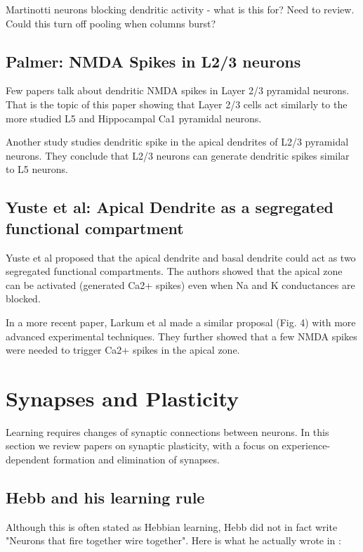 \documentclass{article} %
\begin{document}
Martinotti neurons blocking dendritic activity - what is this for? Need to
review. Could this turn off pooling when columns burst?


\subsection{Palmer: NMDA Spikes in L2/3 neurons}

Few papers talk about dendritic NMDA spikes in Layer 2/3 pyramidal neurons.
That is the topic of this paper \cite{Palmer2014} showing that Layer 2/3 cells
act similarly to the more studied L5 and Hippocampal Ca1 pyramidal neurons.

Another study \cite{Larkum2007} studies dendritic spike in the apical dendrites of L2/3 pyramidal neurons. They conclude that L2/3 neurons can generate dendritic spikes similar to L5 neurons.

\subsection{Yuste et al: Apical Dendrite as a segregated functional compartment}

Yuste et al \cite{Yuste1994} proposed that the apical dendrite and basal dendrite could act as two segregated functional compartments. The authors showed that the apical zone can be activated (generated Ca2+ spikes) even when Na and K conductances are blocked. 

In a more recent paper, Larkum et al \cite{Larkum2009} made a similar proposal (Fig. 4) with more advanced experimental techniques. They further showed that a few NMDA spikes were needed to trigger Ca2+ spikes in the apical zone.


\section{Synapses and Plasticity}

Learning requires changes of synaptic connections between neurons. In this
section we review papers on synaptic plasticity, with a focus on
experience-dependent formation and elimination of synapses.

\subsection{Hebb and his learning rule}

Although this is often stated as Hebbian learning, Hebb did not in fact write
"Neurons that fire together wire together". Here is what he actually wrote in
\cite{Hebb1949}:
\end{document}
